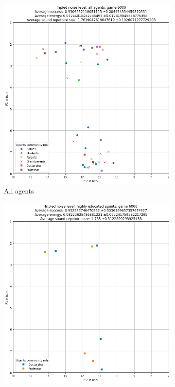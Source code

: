 \begin{figure}[ht]
\begin{subfigure}{.30\textwidth}
        \includegraphics[width=\textwidth]{images/results/triple_noise_all.png}
        \captionsetup{width=0.9\linewidth}
        \captionsetup{justification=centering}
        \caption{All agents}
    \end{subfigure}
    \hspace{0.5cm}
    \begin{subfigure}{.30\textwidth}
        \centering
        \includegraphics[width=\textwidth]{images/results/triple_noise_high.png}

\end{subfigure}
\end{figure}
